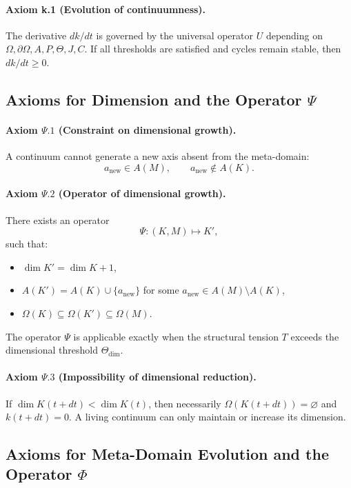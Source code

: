 \paragraph{Axiom k.1 (Evolution of continuumness).}
The derivative \(dk/dt\) is governed by the universal operator \(U\) depending on \(\Omega,\partial\Omega,A,P,\Theta,J,C\).
If all thresholds are satisfied and cycles remain stable, then \(dk/dt\ge 0\).

\subsection{Axioms for Dimension and the Operator \texorpdfstring{\(\Psi\)}{\Psi}}

\paragraph{Axiom \texorpdfstring{\(\Psi.1\)}{\Psi.1} (Constraint on dimensional growth).}
A continuum cannot generate a new axis absent from the meta-domain:
\[
  a_{\mathrm{new}} \in A(M),\qquad a_{\mathrm{new}}\notin A(K).
\]

\paragraph{Axiom \texorpdfstring{\(\Psi.2\)}{\Psi.2} (Operator of dimensional growth).}
There exists an operator
\[
  \Psi : (K,M)\mapsto K',
\]
such that:
\begin{itemize}
  \item \(\dim K' = \dim K + 1\),
  \item \(A(K') = A(K)\cup\{a_{\mathrm{new}}\}\) for some \(a_{\mathrm{new}}\in A(M)\setminus A(K)\),
  \item \(\Omega(K)\subseteq \Omega(K')\subseteq \Omega(M)\).
\end{itemize}
The operator \(\Psi\) is applicable exactly when the structural tension \(T\) exceeds the dimensional threshold \(\Theta_{\mathrm{dim}}\).

\paragraph{Axiom \texorpdfstring{\(\Psi.3\)}{\Psi.3} (Impossibility of dimensional reduction).}
If \(\dim K(t+dt)<\dim K(t)\), then necessarily \(\Omega(K(t+dt))=\varnothing\) and \(k(t+dt)=0\).
A living continuum can only maintain or increase its dimension.

\subsection{Axioms for Meta-Domain Evolution and the Operator \texorpdfstring{\(\Phi\)}{\Phi}}

